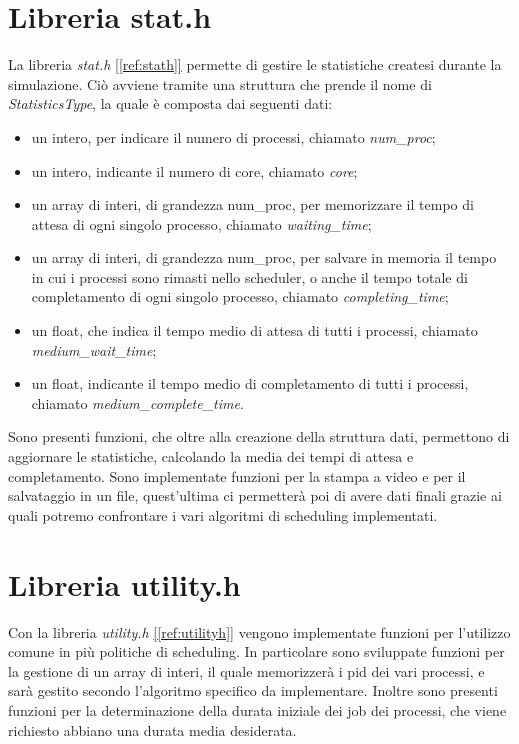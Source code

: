 \documentclass[Lau, oneside]{sapthesis}%
\begin{document}
\section{Libreria stat.h}
\label{sec:stat.h}
La libreria \textit{stat.h} \hyperref[ref:stath]{[\ref*{ref:stath}]} permette di gestire le statistiche createsi durante la simulazione.
Ciò avviene tramite una struttura che prende il nome di \textit{StatisticsType}, la quale è composta dai seguenti dati:
\begin{itemize}
    \item un intero, per indicare il numero di processi, chiamato \textit{num\_proc};
    \item un intero, indicante il numero di core, chiamato \textit{core};
    \item un array di interi, di grandezza num\_proc, per memorizzare il tempo di attesa di ogni singolo processo, chiamato \textit{waiting\_time};
    \item un array di interi, di grandezza num\_proc, per salvare in memoria il tempo in cui i processi sono rimasti nello scheduler, o anche il tempo totale di completamento di ogni singolo processo, chiamato \textit{completing\_time};
    \item un float, che indica il tempo medio di attesa di tutti i processi, chiamato \textit{medium\_wait\_time};
    \item un float, indicante il tempo medio di completamento di tutti i processi, chiamato \textit{medium\_complete\_time}.
\end{itemize}

Sono presenti funzioni, che oltre alla creazione della struttura dati, permettono di aggiornare le statistiche, calcolando la media dei tempi di attesa e completamento.
Sono implementate funzioni per la stampa a video e per il salvataggio in un file, quest'ultima ci permetterà poi di avere dati finali grazie ai quali potremo confrontare i vari algoritmi di scheduling implementati.

\section{Libreria utility.h}
\label{sec:label.h}
Con la libreria \textit{utility.h} \hyperref[ref:utilityh]{[\ref*{ref:utilityh}]} vengono implementate funzioni per l'utilizzo comune in più politiche di scheduling.
In particolare sono sviluppate funzioni per la gestione di un array di interi, il quale memorizzerà i pid dei vari processi, e sarà gestito secondo l'algoritmo specifico da implementare.
Inoltre sono presenti funzioni per la determinazione della durata iniziale dei job dei processi, che viene richiesto abbiano una durata media desiderata.
\end{document}
